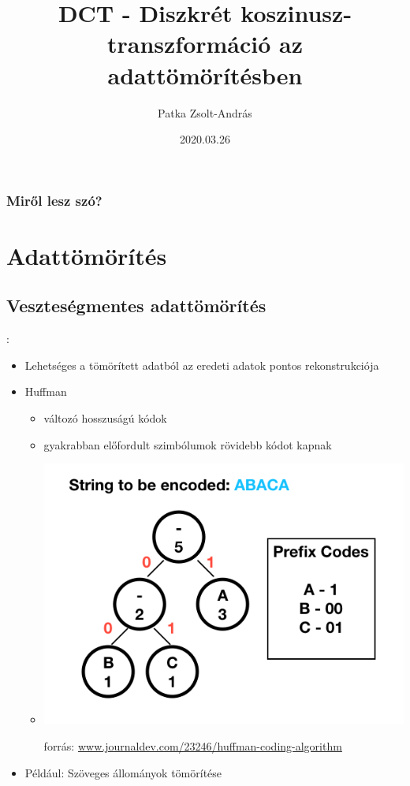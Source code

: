 \documentclass{beamer}
\title{DCT - Diszkrét koszinusz-transzformáció az adattömörítésben}
\author{Patka Zsolt-András}
\institute{Sapientia EMTE - Számítástechnika IV}
\date{2020.03.26}
\begin{document}
\begin{frame}
    \titlepage
\end{frame}

\begin{frame}
\frametitle{Miről lesz szó?}
\tableofcontents
\end{frame}

\section{Adattömörítés}

\subsection{Veszteségmentes adattömörítés}
\begin{frame}{\secname : \subsecname}
\begin{itemize}
    \item Lehetséges a tömörített adatból az eredeti adatok pontos rekonstrukciója
    \item Huffman
    \begin{itemize}
    \item változó hosszuságú kódok
    \item gyakrabban előfordult szimbólumok rövidebb kódot kapnak
    \item \includegraphics[scale=0.3]{figures/huffman.png} 
    \begin{footnotesize}
        forrás: \url{www.journaldev.com/23246/huffman-coding-algorithm}
        \end{footnotesize}
    \end{itemize}
    \item Például: Szöveges állományok tömörítése
\end{itemize}    
\end{frame}
\end{document}
